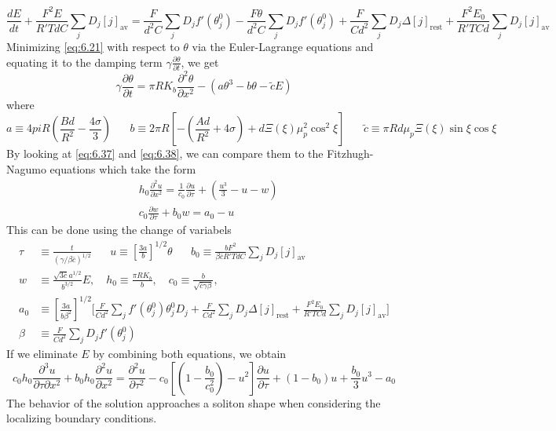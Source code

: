 \documentclass{article}
\newcommand{\pd}[2]{\frac{\partial #1}{\partial #2}}
\newcommand{\od}[2]{\frac{d #1}{d #2}}
\newcommand{\pdt}[2]{\frac{\partial ^2 #1}{\partial #2 ^2}}
\newcommand{\twen}{\hspace{20pt}}
\numberwithin{equation}{section}
\begin{document}
\begin{equation}
    \od{E}{t} + \frac{F^2E}{R'TdC}\sum_j D_j[j]_{\text{av}} = \frac{F}{d^2C}\sum_jD_jf'(\theta^0_j) - \frac{F\theta}{d^2C} \sum_jD_jf'(\theta^0_j) + \frac{F}{Cd^2}\sum_j D_j \Delta [j]_{\text{rest}} + \frac{F^2E_0}{R'TCd}\sum_j D_j [j]_{\text{av}} \label{eq:6.37}
\end{equation}
Minimizing \eqref{eq:6.21} with respect to $\theta$ via the Euler-Lagrange equations and equating it to the damping term $\gamma \pd{\theta}{t}$, we get 
\begin{equation}
    \gamma \pd{\theta}{t} = \pi RK_b \pdt{\theta}{x} -(a\theta^3-b\theta -\tilde{c}E) \label{eq:6.38}
\end{equation}
where 
\begin{equation*}
    a \equiv 4pi R\left( \frac{Bd}{R^2} - \frac{4\sigma}{3}\right) \twen b\equiv 2\pi R \left[ -\left( \frac{Ad}{R^2} + 4\sigma\right) + d\Xi(\xi)\mu_p^2\cos^2\xi \right] \twen \tilde{c} \equiv \pi R d\mu_p\Xi(\xi)\sin\xi\cos\xi 
\end{equation*}
By looking at \eqref{eq:6.37} and \eqref{eq:6.38}, we can compare them to the Fitzhugh-Nagumo equations which take the form 
\begin{equation}
\begin{split}
    &h_0 \pdt{u}{x} = \frac{1}{c_0}\pd{u}{\tau} + \left( \frac{u^3}{3}-u-w\right)\\
    &c_0 \pd{w}{\tau} +b_0w = a_0-u
\end{split}
\end{equation}
This can be done using the change of variabels 
\begin{equation}
    \begin{split}
        \tau &\equiv \frac{t}{(\gamma / \beta\bar{c})^{1/2}} \twen u \equiv \left[ \frac{3a}{b} \right]^{1/2} \theta \twen 
b_0 \equiv \frac{bF^2}{\beta\bar{c}R'TdC} \sum_j D_j[j]_{\text{av}}  \\
w &\equiv \frac{\sqrt{3\bar{c}}a^{1/2}}{b^{3/2}}E, \quad h_0 \equiv \frac{\pi R K_b}{b} , \quad c_0 \equiv \frac{b}{\sqrt{\bar{c}\gamma\beta}} , \\
a_0 &\equiv \left[ \frac{3a}{b\beta^2} \right]^{1/2} \Bigg[ \frac{F}{Cd^2} \sum_j f'(\theta_j^0)\theta_j^0 D_j 
 + \frac{F}{Cd^2} \sum_j D_j \Delta[j]_{\text{rest}} 
 + \frac{F^2 E_0}{R'TCd} \sum_j D_j[j]_{\text{av}} \Bigg] \\
 \beta &\equiv \frac{F}{Cd^2}\sum_j D_j f'(\theta^0_j)
    \end{split}
\end{equation}
If we eliminate $E$ by combining both equations, we obtain 
\begin{equation}
    c_0h_0 \frac{\partial^3 u}{\partial \tau \partial x^2} + b_0h_0\pdt{u}{x} = \pdt{u}{\tau}-c_0\left[ \left( 1- \frac{b_0}{c_0^2} \right)-u^2 \right]\pd{u}{\tau} + (1-b_0)u + \frac{b_0}{3}u^3-a_0
\end{equation}
The behavior of the solution approaches a soliton shape when considering the localizing boundary conditions. 
\end{document}
